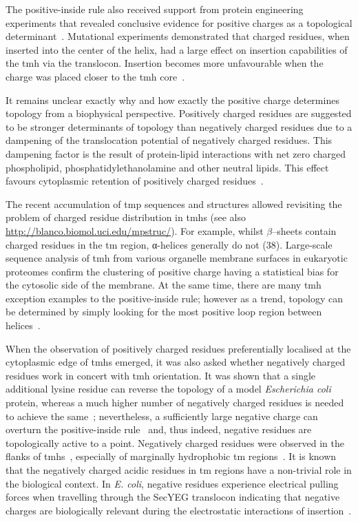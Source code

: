 The positive-inside rule also received support from protein engineering experiments that revealed conclusive evidence for positive charges as a topological determinant~\cite{VonHeijne1989, Beltzer1991, Kida2006, Nilsson1990}.
Mutational experiments demonstrated that charged residues, when inserted into the center of the helix, had a large effect on insertion capabilities of the \gls{tmh} via the translocon.
Insertion becomes more unfavourable when the charge was placed closer to the \gls{tmh} core~\cite{Hessa2005}.

It remains unclear exactly why and how exactly the positive charge determines topology from a biophysical perspective.
Positively charged residues are suggested to be stronger determinants of topology than negatively charged residues due to a dampening of the translocation potential of negatively charged residues.
This dampening factor is the result of protein-lipid interactions with net zero charged phospholipid, phosphatidylethanolamine and other neutral lipids.
This effect favours cytoplasmic retention of positively charged residues~\cite{Bogdanov2014}.

The recent accumulation of \gls{tmp} sequences and structures allowed revisiting the problem of charged residue distribution in \gls{tmh}s (see also \url{http://blanco.biomol.uci.edu/mpstruc/}).
For example, whilst \(\beta\)--sheets contain charged residues in the \gls{tm} region, α-helices generally do not (38).
Large-scale sequence analysis of \gls{tmh} from various organelle membrane surfaces in eukaryotic proteomes confirm the clustering of positive charge having a statistical bias for the cytosolic side of the membrane.
At the same time, there are many \gls{tmh} exception examples to the positive-inside rule; however as a trend, topology can be determined by simply looking for the most positive loop region between helices~\cite{Sharpe2010, Baeza-Delgado2013}.

When the observation of positively charged residues preferentially localised at the cytoplasmic edge of \gls{tmh}s emerged, it was also asked whether negatively charged residues work in concert with \gls{tmh} orientation.
It was shown that a single additional lysine residue can reverse the topology of a model \textit{Escherichia coli} protein, whereas a much higher number of negatively charged residues is needed to achieve the same~\cite{Nilsson1990}; nevertheless, a sufficiently large negative charge can overturn the positive-inside rule~\cite{Andersson1993, Kim1994} and, thus indeed, negative residues are topologically active to a point.
Negatively charged residues were observed in the flanks of \gls{tmh}s~\cite{Baeza-Delgado2013}, especially of marginally hydrophobic \gls{tm} regions~\cite{Delgado-Partin1998}.
It is known that the negatively charged acidic residues in \gls{tm} regions have a non-trivial role in the biological context.
In \textit{E.
coli}, negative residues experience electrical pulling forces when travelling through the SecYEG translocon indicating that negative charges are biologically relevant during the electrostatic interactions of insertion~\cite{Ismail2012, Ismail2015}.

